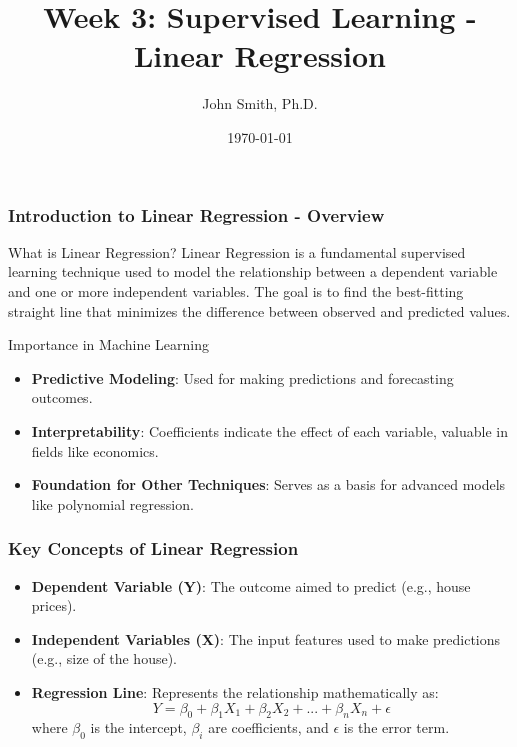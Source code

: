 \documentclass[aspectratio=169]{beamer}
\title[Supervised Learning]{Week 3: Supervised Learning - Linear Regression}
\author[J. Smith]{John Smith, Ph.D.}
\institute[University Name]{
  Department of Computer Science\\
  University Name\\
  \vspace{0.3cm}
  Email: email@university.edu\\
  Website: www.university.edu
}
\date{\today}
\begin{document}
\frame{\titlepage}

\begin{frame}[fragile]
    \frametitle{Introduction to Linear Regression - Overview}
    \begin{block}{What is Linear Regression?}
        Linear Regression is a fundamental supervised learning technique used to model the relationship between a dependent variable and one or more independent variables. The goal is to find the best-fitting straight line that minimizes the difference between observed and predicted values.
    \end{block}
    
    \begin{block}{Importance in Machine Learning}
        \begin{itemize}
            \item \textbf{Predictive Modeling}: Used for making predictions and forecasting outcomes.
            \item \textbf{Interpretability}: Coefficients indicate the effect of each variable, valuable in fields like economics.
            \item \textbf{Foundation for Other Techniques}: Serves as a basis for advanced models like polynomial regression.
        \end{itemize}
    \end{block}
\end{frame}

\begin{frame}[fragile]
    \frametitle{Key Concepts of Linear Regression}
    \begin{itemize}
        \item \textbf{Dependent Variable (Y)}: The outcome aimed to predict (e.g., house prices).
        \item \textbf{Independent Variables (X)}: The input features used to make predictions (e.g., size of the house).
        \item \textbf{Regression Line}: Represents the relationship mathematically as:
        \begin{equation}
            Y = \beta_0 + \beta_1X_1 + \beta_2X_2 + ... + \beta_nX_n + \epsilon
        \end{equation}
        where $\beta_0$ is the intercept, $\beta_i$ are coefficients, and $\epsilon$ is the error term.
    \end{itemize}
\end{frame}
\end{document}
